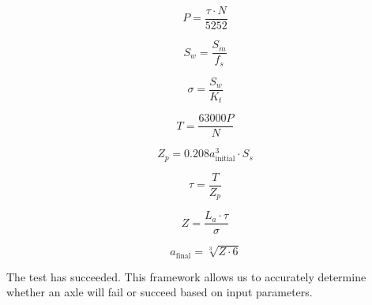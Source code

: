 \[
P = \frac{\tau \cdot N}{5252}
\]

\[
S_w = \frac{S_m}{f_s}
\]

\[
\sigma = \frac{S_w}{K_t}
\]

\[
T = \frac{63000P}{N}
\]

\[
Z_p = 0.208a_{\text{initial}}^3 \cdot S_s
\]

\[
\tau = \frac{T}{Z_p}
\]

\[
Z = \frac{L_a \cdot \tau}{\sigma}
\]

\[
a_{\text{final}} = \sqrt[3]{Z \cdot 6}
\]

The test has succeeded. This framework allows us to accurately determine whether an axle will fail or succeed based on input parameters.
